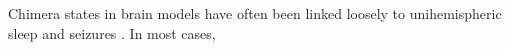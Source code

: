 Chimera states in brain models have often been linked loosely to unihemispheric sleep and seizures \cite{Abrams2008,Andrzejak2016,Hizanidis2016}.
In most cases,
\cite{Andrzejak2016,Santos2017,Hizanidis2016}

